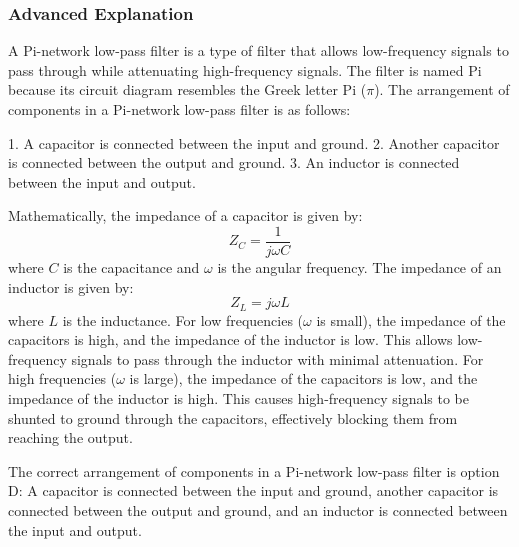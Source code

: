 \subsubsection{Advanced Explanation}
A Pi-network low-pass filter is a type of filter that allows low-frequency signals to pass through while attenuating high-frequency signals. The filter is named Pi because its circuit diagram resembles the Greek letter Pi ($\pi$). The arrangement of components in a Pi-network low-pass filter is as follows:

1. A capacitor is connected between the input and ground.
2. Another capacitor is connected between the output and ground.
3. An inductor is connected between the input and output.

Mathematically, the impedance of a capacitor is given by:
\[
Z_C = \frac{1}{j\omega C}
\]
where $C$ is the capacitance and $\omega$ is the angular frequency. The impedance of an inductor is given by:
\[
Z_L = j\omega L
\]
where $L$ is the inductance. For low frequencies ($\omega$ is small), the impedance of the capacitors is high, and the impedance of the inductor is low. This allows low-frequency signals to pass through the inductor with minimal attenuation. For high frequencies ($\omega$ is large), the impedance of the capacitors is low, and the impedance of the inductor is high. This causes high-frequency signals to be shunted to ground through the capacitors, effectively blocking them from reaching the output.

The correct arrangement of components in a Pi-network low-pass filter is option D: A capacitor is connected between the input and ground, another capacitor is connected between the output and ground, and an inductor is connected between the input and output.

